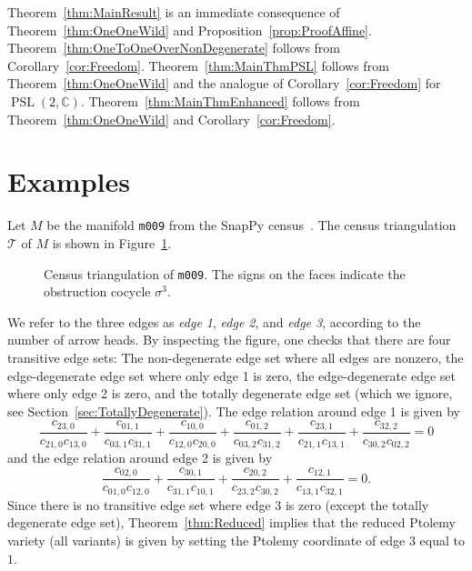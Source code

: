 \documentclass[11pt]{amsart}
\theoremstyle{plain}
\theoremstyle{definition}
\numberwithin{equation}{section}
\newcommand{\C}{\mathbb C}
\newcommand{\T}{\mathcal T}
\DeclareMathOperator{\PSL}{PSL}
\begin{document}
Theorem~\ref{thm:MainResult} is an immediate consequence of Theorem~\ref{thm:OneOneWild} and Proposition~\ref{prop:ProofAffine}. Theorem~\ref{thm:OneToOneOverNonDegenerate} follows from Corollary~\ref{cor:Freedom}. Theorem~\ref{thm:MainThmPSL} follows from Theorem~\ref{thm:OneOneWild} and the analogue of Corollary~\ref{cor:Freedom} for $\PSL(2,\C)$. Theorem~\ref{thm:MainThmEnhanced} follows from Theorem~\ref{thm:OneOneWild} and Corollary~\ref{cor:Freedom}.

\section{Examples}\label{sec:Examples}
Let $M$ be the manifold \texttt{m009} from the SnapPy census~\cite{SnapPy}. The census triangulation $\T$ of $M$ is shown in Figure~\ref{fig:Trigm009}.
\begin{figure}[htb]
\scalebox{0.66}{}
\caption{Census triangulation of \texttt{m009}. The signs on the faces indicate the obstruction cocycle $\sigma^3$.}\label{fig:Trigm009}
\end{figure}
We refer to the three edges as \emph{edge 1}, \emph{edge 2}, and \emph{edge 3}, according to the number of arrow heads. By inspecting the figure, one checks that there are four transitive edge sets: The non-degenerate edge set where all edges are nonzero, the edge-degenerate edge set where only edge 1 is zero, the edge-degenerate edge set where only edge 2 is zero, and the totally degenerate edge set (which we ignore, see Section~\ref{sec:TotallyDegenerate}). The edge relation around edge 1 is given by
\begin{equation}\label{eq:EdgeOneRelation}
\frac{c_{23,0}}{c_{21,0}c_{13,0}}+\frac{c_{01,1}}{c_{03,1}c_{31,1}}+\frac{c_{10,0}}{c_{12,0}c_{20,0}}+\frac{c_{01,2}}{c_{03,2}c_{31,2}}+\frac{c_{23,1}}{c_{21,1}c_{13,1}}+\frac{c_{32,2}}{c_{30,2}c_{02,2}}=0
\end{equation}
and the edge relation around edge 2 is given by
\begin{equation}\label{eq:EdgeTwoRelation}
\frac{c_{02,0}}{c_{01,0}c_{12,0}}+\frac{c_{30,1}}{c_{31,1}c_{10,1}}+\frac{c_{20,2}}{c_{23,2}c_{30,2}}+\frac{c_{12,1}}{c_{13,1}c_{32,1}}=0.
\end{equation}
Since there is no transitive edge set where edge 3 is zero (except the totally degenerate edge set), Theorem~\ref{thm:Reduced} implies that the reduced Ptolemy variety (all variants) is given by setting the Ptolemy coordinate of edge 3 equal to $1$.
\end{document}
